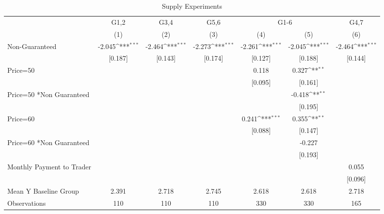 {
\def\sym#1{\ifmmode^{#1}\else\(^{#1}\)\fi}
\begin{longtable}{l*{6}{c}}
\caption{Supply Experiments \label{tab:lif}}\\
\hline\hline\endfirsthead\hline\endhead\hline\endfoot\endlastfoot
                &\multicolumn{1}{c}{G1,2}&\multicolumn{1}{c}{G3,4}&\multicolumn{1}{c}{G5,6}&\multicolumn{2}{c}{G1-6}             &\multicolumn{1}{c}{G4,7}\\\cmidrule(lr){2-2}\cmidrule(lr){3-3}\cmidrule(lr){4-4}\cmidrule(lr){5-6}\cmidrule(lr){7-7}
                &\multicolumn{1}{c}{(1)}         &\multicolumn{1}{c}{(2)}         &\multicolumn{1}{c}{(3)}         &\multicolumn{1}{c}{(4)}         &\multicolumn{1}{c}{(5)}         &\multicolumn{1}{c}{(6)}         \\
\hline
Non-Guaranteed  &   -2.045\sym{***}&   -2.464\sym{***}&   -2.273\sym{***}&   -2.261\sym{***}&   -2.045\sym{***}&   -2.464\sym{***}\\
                &  [0.187]         &  [0.143]         &  [0.174]         &  [0.127]         &  [0.188]         &  [0.144]         \\
Price=50        &                  &                  &                  &    0.118         &    0.327\sym{**} &                  \\
                &                  &                  &                  &  [0.095]         &  [0.161]         &                  \\
Price=50 *Non Guaranteed&                  &                  &                  &                  &   -0.418\sym{**} &                  \\
                &                  &                  &                  &                  &  [0.195]         &                  \\
Price=60        &                  &                  &                  &    0.241\sym{***}&    0.355\sym{**} &                  \\
                &                  &                  &                  &  [0.088]         &  [0.147]         &                  \\
Price=60 *Non Guaranteed&                  &                  &                  &                  &   -0.227         &                  \\
                &                  &                  &                  &                  &  [0.193]         &                  \\
Monthly Payment to Trader&                  &                  &                  &                  &                  &    0.055         \\
                &                  &                  &                  &                  &                  &  [0.096]         \\
\hline
Mean Y Baseline Group&    2.391         &    2.718         &    2.745         &    2.618         &    2.618         &    2.718         \\
Observations    &      110         &      110         &      110         &      330         &      330         &      165         \\
\hline\hline
\end{longtable}
}
